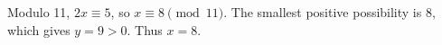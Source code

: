 Modulo 11, $ 2x\equiv5 $, so $ x\equiv8\pmod{11}$. The smallest positive possibility is 8, which gives $ y=9>0 $. Thus $\boxed{x=8}$.
